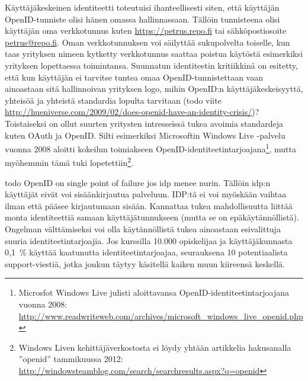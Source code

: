 \documentclass[finnish,gradu]{tktltiki}
\begin{document}
  Käyttäjäkeskeinen identiteetti toteutuisi ihanteellisesti siten, että käyttäjän OpenID-tunniste olisi hänen omassa hallinnassaan. Tällöin tunnisteena olisi käyttäjän oma verkkotunnus kuten \url{https://petrus.repo.fi} tai sähköpostiosoite \url{petrus@repo.fi}. Oman verkkotunnuksen voi säilyttää sukupolvelta toiselle, kun taas yrityksen nimeen kytketty verkkotunnus saattaa poistua käytöstä esimerkiksi yrityksen lopettaessa toimintansa. Suunnatun identiteetin kritiikkinä on esitetty, että kun käyttäjän ei tarvitse tuntea omaa OpenID-tunnistettaan vaan ainoastaan sitä hallinnoivan yrityksen logo, mihin OpenID:n käyttäjäkeskeisyyttä, yhteisöä ja yhteistä standardia lopulta tarvitaan (todo viite \url{http://hueniverse.com/2009/02/does-openid-have-an-identity-crisis/})? Toistaiseksi on ollut suurten yritysten intresseissä tukea avoimia standardeja kuten OAuth ja OpenID. Silti esimerkiksi Microsoftin Windows Live -palvelu vuonna 2008 aloitti kokeilun toimiakseen OpenID-identiteetintarjoajana\footnote{Microsfot Windows Live julisti aloittavansa OpenID-identiteetintarjoajana vuonna 2008: \\ \url{http://www.readwriteweb.com/archives/microsoft_windows_live_openid.php}}, mutta myöhemmin tämä tuki lopetettiin\footnote{Windows Liven kehittäjäverkostosta ei löydy yhtään artikkelia hakusanalla ''openid'' tammikuussa 2012: \url{http://windowsteamblog.com/search/searchresults.aspx?q=openid}}.


  todo
  OpenID on single point of failure jos idp menee nurin. Tällöin idp:n käyttäjät eivät voi sisäänkirjautua palveluun. IDP:tä ei voi myöskään vaihtaa ilman että pääsee kirjautumaan sisään. Kannattaa tukea mahdollisuutta liittää monta identiteettiä samaan käyttäjätunnukseen (mutta se on epäkäytännöllistä). Ongelman välttämiseksi voi olla käytännöllistä tukea ainoastaan esivalittuja suuria identiteetintarjoajia. Jos kurssilla 10.000 opiskelijaa ja käyttäjäkunnasta 0,1~\% käyttää kaatunutta identiteetintarjoajaa, seurauksena 10 potentiaalista support-viestiä, jotka jonkun täytyy käsitellä kaiken muun kiireensä keskellä.
\end{document}
